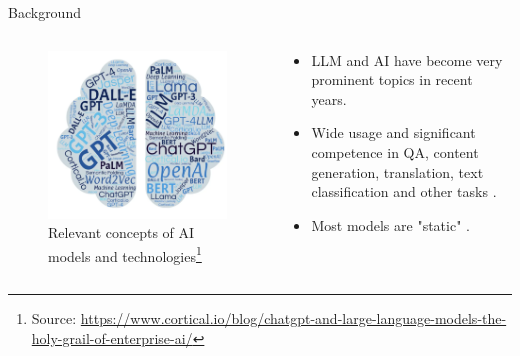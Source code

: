 \documentclass[t]{beamer}
\begin{document}
\begin{frame}{Background}
  \begin{columns}
    \begin{column}{0.4\textwidth}
        \begin{figure}
            \centering
            \includegraphics[width=\textwidth]{llm1.png}
            \caption{Relevant concepts of AI models and technologies\footnote{Source: \url{https://www.cortical.io/blog/chatgpt-and-large-language-models-the-holy-grail-of-enterprise-ai/}}}
            \label{fig:llm1}
        \end{figure}
    \end{column}
    \begin{column}{0.5\textwidth}
        \begin{itemize}
            \item LLM and AI have become very prominent topics in recent years.
            \item Wide usage and significant competence in QA, content generation, translation, text classification and other tasks \cite{Liu23}.
            \item Most models are "static" \cite{Gupta23}.
        \end{itemize}
    \end{column}
\end{columns}
\end{frame}
\end{document}
